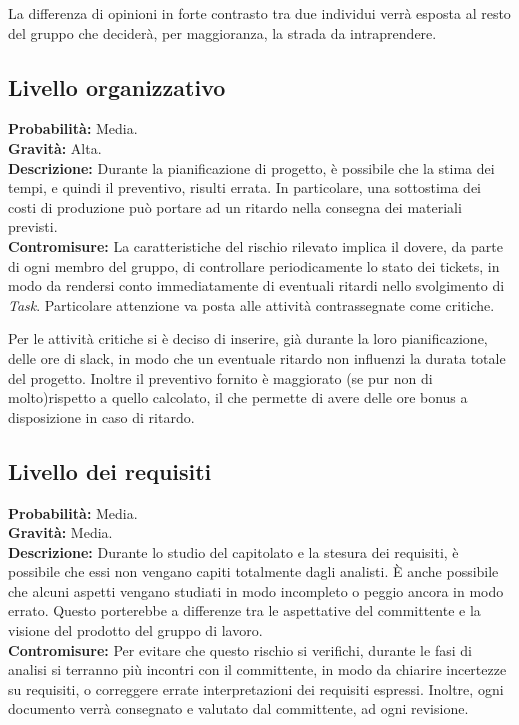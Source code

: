\documentclass[a4paper]{article}
\begin{document}
					La differenza di opinioni in forte contrasto tra due individui verrà esposta al resto del 
					gruppo che deciderà, per maggioranza, la strada da intraprendere.
		\subsection{Livello organizzativo}
		\label{LivelloOrganizzativo}
			\textbf{Probabilità:} Media.
			\\ 
			\textbf{Gravità:} Alta.
			\\ 
			\textbf{Descrizione:} Durante la pianificazione di progetto, è possibile che la stima dei tempi, e quindi il
				preventivo, risulti errata. In particolare, una sottostima dei costi di produzione può 
				portare ad un ritardo nella consegna dei materiali previsti. 
			\\ 
			\textbf{Contromisure:} La caratteristiche del rischio rilevato implica il dovere, da parte di ogni membro del 
				gruppo, di controllare periodicamente lo stato dei tickets, in modo da rendersi conto 
				immediatamente di eventuali ritardi nello svolgimento di \emph{Task}. Particolare attenzione
				va posta alle attività contrassegnate come critiche. 
				
				Per le attività critiche si è deciso di inserire, già durante la loro pianificazione, delle 
				ore di slack, in modo che un eventuale ritardo non influenzi la durata totale del progetto. 
				Inoltre il preventivo fornito è maggiorato (se pur non di molto)rispetto a quello calcolato, 
				il che permette di avere delle ore bonus a disposizione in caso di ritardo.
		\subsection{Livello dei requisiti}
			\textbf{Probabilità:} Media.\\ 
			\textbf{Gravità:} Media.\\ 
			\textbf{Descrizione:} Durante lo studio del capitolato e la stesura dei requisiti, è possibile che essi non vengano 
				capiti totalmente dagli analisti. È anche possibile che alcuni aspetti vengano studiati in modo 
				incompleto o peggio ancora in modo errato. Questo porterebbe a differenze tra le aspettative del 
				committente e la visione del prodotto del gruppo di lavoro.\\ 
			\textbf{Contromisure:} Per evitare che questo rischio si verifichi, durante le fasi di analisi si terranno più incontri 
				con il committente, in modo da chiarire incertezze su requisiti, o correggere errate interpretazioni 
				dei requisiti espressi. Inoltre, ogni documento verrà consegnato e valutato dal committente, ad ogni 
				revisione.
				
\end{document}
